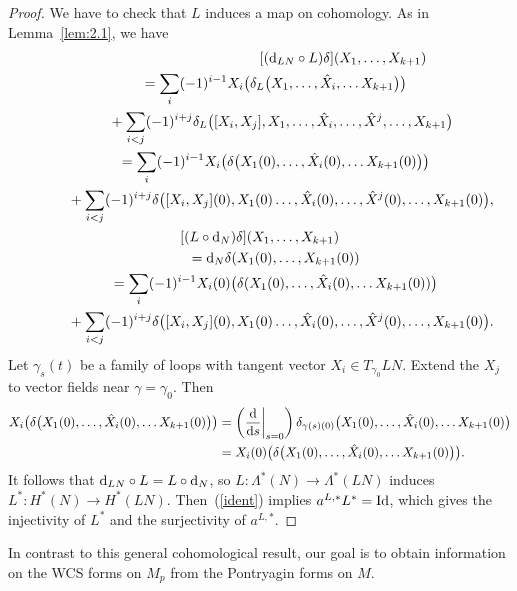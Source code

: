 \documentclass[10pt,a4paper]{amsart}
\numberwithin{equation}{section}
\theoremstyle{definition}
\begin{document}
\begin{proof} We have to check that $L$ induces a map on cohomology. As in Lemma~\ref{lem:2.1}, we have
\begin{gather*}\lefteqn{[ ( {\rm d}_{LN}\circ L) \delta](X_1,\dots, X_{k+1})}\\
\qquad{} = \sum_i (-1)^{i-1}X_i\bigl(\delta_L\bigl(X_1,\dots,\hat X_i,\dots X_{k+1} \bigr)\bigr)\\
 \qquad\quad{} + \sum_{i< j}(-1)^{i+j} \delta_L\bigl([X_i,X_j], X_1,\dots, \hat X_i,\dots, \hat X^j,\dots, X_{k+1}\bigr) \\
\qquad{}= \sum_i (-1)^{i-1}X_i\bigl(\delta\bigl(X_1(0),\dots,\hat X_i(0),\dots X_{k+1}(0) \bigr)\bigr)\\
\qquad\quad{} + \sum_{i< j}(-1)^{i+j} \delta\bigl([X_i,X_j](0), X_1(0)\dots, \hat X_i(0),\dots, \hat X^j(0),\dots, X_{k+1}(0)\bigr),\\
[(L\circ {\rm d}_N)\delta](X_1,\dots, X_{k+1})\\
\qquad{}= {\rm d}_N\delta(X_1(0),\dots, X_{k+1}(0)) \\
\qquad{}= \sum_i (-1)^{i-1}X_i(0)\bigl(\delta(X_1(0),\dots,\hat X_i(0),\dots X_{k+1}(0) )\bigr)\\
\qquad\quad{} + \sum_{i< j}(-1)^{i+j} \delta\bigl([X_i,X_j](0), X_1(0)\dots, \hat X_i(0),\dots, \hat X^j(0),\dots, X_{k+1}(0)\bigr).
\end{gather*}
Let $\gamma_s(t)$ be a family of loops with tangent vector $X_i\in T_{\gamma_0}LN$. Extend the $X_j$ to vector fields near $\gamma = \gamma_0$. Then
\begin{align*}X_i \bigl( \delta\bigl(X_1(0),\dots,\hat X_i(0),\dots X_{k+1}(0) \bigr)\bigr) &= \left(\frac{{\rm d}}{{\rm d}s}\biggr|_{s=0} \right) \delta_{\gamma(s)(0)}
\bigl(X_1(0),\dots,\hat X_i(0),\dots X_{k+1}(0)\bigr)\\
& = X_i(0) \bigl( \delta\bigl(X_1(0),\dots,\hat X_i(0),\dots X_{k+1}(0) \bigr)\bigr).
\end{align*}
It follows that $ {\rm d}_{LN}\circ L = L\circ {\rm d}_N$, so
$L\colon \Lambda^*(N)\to\Lambda^*(LN)$ induces $L^*\colon H^*(N) \to H^*(LN)$. Then~(\ref{ident}) implies
$ a^{L,*} L^*= {\rm Id}$, which gives the injectivity of $L^*$ and the surjectivity of $a^{L,*}$.
\end{proof}

In contrast to this general cohomological
result, our goal is to obtain
information on the WCS forms on $M_p$ from the Pontryagin forms on $M$.
\end{document}
